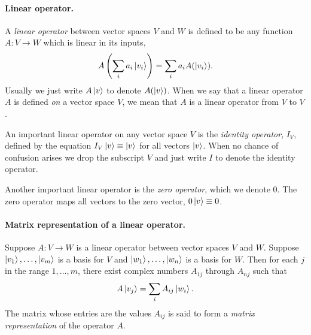 \documentclass{article}
\begin{document}
\paragraph{Linear operator.} A \emph{linear operator} between vector spaces $V$
and $W$ is defined to be any function $A : V \rightarrow W$ which is linear in
its inputs, \begin{equation}
  A\left(\sum_i a_i\ket{v_i} \right) = \sum_i a_i A(\ket{v_i}).
    \label{eq:lin-op}
\end{equation} Usually we just write $A\ket{v}$ to denote $A(\ket{v})$. When we
say that a linear operator $A$ is defined \emph{on} a vector space $V$, we mean
that $A$ is a linear operator from $V$ to $V$.

An important linear operator on any vector space $V$ is the \emph{identity
operator}, $I_V$, defined by the equation $I_V\ket{v} \equiv \ket{v}$ for all
vectors $\ket{v}$. When no chance of confusion arises we drop the subscript $V$
and just write $I$ to denote the identity operator.

Another important linear operator is the \emph{zero operator}, which we denote
0. The zero operator maps all vectors to the zero vector, $0\ket{v} \equiv 0$.

\paragraph{Matrix representation of a linear operator.} Suppose $A : V
\rightarrow W$ is a linear operator between vector spaces $V$ and $W$. Suppose
$\ket{v_1}, \ldots, \ket{v_m}$ is a basis for $V$ and $\ket{w_1}, \ldots,
\ket{w_n}$ is a basis for $W$. Then for each $j$ in the range $1, \ldots, m$,
there exist complex numbers $A_{1j}$ through $A_{nj}$ such that
\begin{equation}
  A\ket{v_j} = \sum_i A_{ij}\ket{w_i}.
\end{equation} The matrix whose entries are the values $A_{ij}$ is said to form
a \emph{matrix representation} of the operator $A$.
\end{document}
